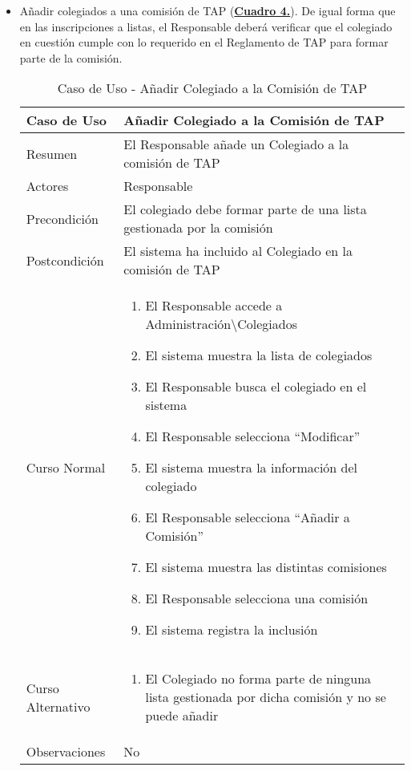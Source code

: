 \begin{itemize}
  \pagebreak
	\item \addtocounter{tabla}{1} Añadir colegiados a una comisión de TAP (\textbf{\hyperref[tab:curIncluirColegComisionTAP]{Cuadro 4.}}). De igual forma que en las inscripciones a listas, el Responsable deberá verificar que el colegiado en cuestión cumple con lo requerido en el Reglamento de TAP \cite{reglamentotapcpiia} para formar parte de la comisión.
		\begin{table}[!htbp]
		  \centering  \addtocounter{casouso}{1}
		  \begin{tabular}{|l | p{100mm}|}
		    \textbf{Caso de Uso}  & \textbf{Añadir Colegiado a la Comisión de TAP} \\ \hline
		    Resumen 		 & El Responsable añade un Colegiado a la comisión de TAP \\ \hline
		    Actores  		 & Responsable \\ \hline
		    Precondición    & El colegiado debe formar parte de una lista gestionada por la comisión  \\ \hline
		    Postcondición   & El sistema ha incluido al Colegiado en la comisión de TAP \\ \hline
		    Curso Normal   	& \begin{enumerate}
			  \item El Responsable accede a Administración\textbackslash Colegiados
			  \item El sistema muestra la lista de colegiados
			  \item El Responsable busca el colegiado en el sistema
			  \item El Responsable selecciona ``Modificar''
			  \item El sistema muestra la información del colegiado
			  \item El Responsable selecciona ``Añadir a Comisión''
			  \item El sistema muestra las distintas comisiones
			  \item El Responsable selecciona una comisión
			  \item El sistema registra la inclusión
		    \end{enumerate}  \\ \hline
		    Curso Alternativo  & \begin{enumerate}
			  \item El Colegiado no forma parte de ninguna lista gestionada por dicha comisión y no se puede añadir
		    \end{enumerate}  \\ \hline
		    Observaciones 	 & No  \\ \hline
		  \end{tabular}
		  \caption{Caso de Uso  - Añadir Colegiado a la Comisión de TAP}
		  \label{tab:curIncluirColegComisionTAP}
		\end{table}
		\FloatBarrier
  

\end{itemize}
